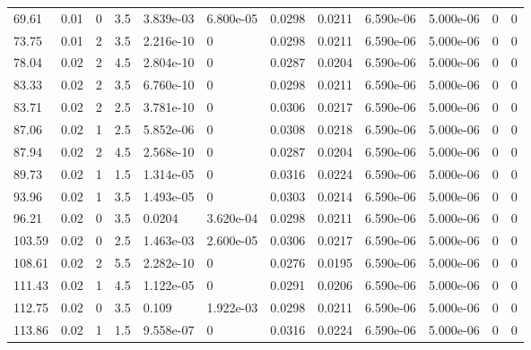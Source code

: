 \documentclass[preview]{standalone}
\begin{document}
{{\begin{tabular}{L{1.2cm}C{1.2cm} C{0.3cm}C{0.5cm} C{1.4cm}C{1.4cm} C{1.4cm}C{1.4cm} C{1.6cm}C{1.6cm} C{1.6cm}C{1.6cm}}
  69.61  &  0.01  & 0     & 3.5 &  3.839e-03  & 6.800e-05  &  0.0298&   0.0211& 6.590e-06 & 5.000e-06   &  0 & 0  \\ 
  73.75  &  0.01  & 2     & 3.5 &  2.216e-10  & 0  &  0.0298&   0.0211& 6.590e-06 & 5.000e-06   &  0 & 0  \\ 
  78.04  &  0.02  & 2     & 4.5 &  2.804e-10  & 0  &  0.0287&   0.0204& 6.590e-06 & 5.000e-06   &  0 & 0  \\ 
  83.33  &  0.02  & 2     & 3.5 &  6.760e-10  & 0  &  0.0298&   0.0211& 6.590e-06 & 5.000e-06   &  0 & 0  \\ 
  83.71  &  0.02  & 2     & 2.5 &  3.781e-10  & 0  &  0.0306&   0.0217& 6.590e-06 & 5.000e-06   &  0 & 0  \\ 
  87.06  &  0.02  & 1     & 2.5 &  5.852e-06  & 0  &  0.0308&   0.0218& 6.590e-06 & 5.000e-06   &  0 & 0  \\ 
  87.94  &  0.02  & 2     & 4.5 &  2.568e-10  & 0  &  0.0287&   0.0204& 6.590e-06 & 5.000e-06   &  0 & 0  \\ 
  89.73  &  0.02  & 1     & 1.5 &  1.314e-05  & 0  &  0.0316&   0.0224& 6.590e-06 & 5.000e-06   &  0 & 0  \\ 
  93.96  &  0.02  & 1     & 3.5 &  1.493e-05  & 0  &  0.0303&   0.0214& 6.590e-06 & 5.000e-06   &  0 & 0  \\ 
  96.21  &  0.02  & 0     & 3.5 &  0.0204  & 3.620e-04  &  0.0298&   0.0211& 6.590e-06 & 5.000e-06   &  0 & 0  \\ 
  103.59  &  0.02  & 0     & 2.5 &  1.463e-03  & 2.600e-05  &  0.0306&   0.0217& 6.590e-06 & 5.000e-06   &  0 & 0  \\ 
  108.61  &  0.02  & 2     & 5.5 &  2.282e-10  & 0  &  0.0276&   0.0195& 6.590e-06 & 5.000e-06   &  0 & 0  \\ 
  111.43  &  0.02  & 1     & 4.5 &  1.122e-05  & 0  &  0.0291&   0.0206& 6.590e-06 & 5.000e-06   &  0 & 0  \\ 
  112.75  &  0.02  & 0     & 3.5 &  0.109  & 1.922e-03  &  0.0298&   0.0211& 6.590e-06 & 5.000e-06   &  0 & 0  \\ 
  113.86  &  0.02  & 1     & 1.5 &  9.558e-07  & 0  &  0.0316&   0.0224& 6.590e-06 & 5.000e-06   &  0 & 0  \\ 
\hline 
\end{tabular} 

}}
\end{document}
